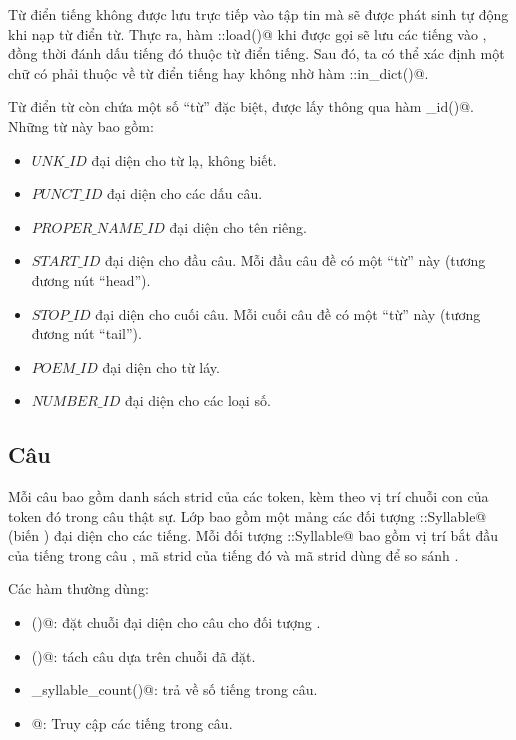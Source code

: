 \documentclass[a4paper,oneside,14pt]{extbook} %
\begin{document}
Từ điển tiếng không được lưu trực tiếp vào tập tin mà sẽ được phát
sinh tự động khi nạp từ điển từ. Thực ra, hàm \verb@WordNode::load()@
khi được gọi sẽ lưu các tiếng vào \verb@StringArchive@, đồng thời đánh
dấu tiếng đó thuộc từ điển tiếng. Sau đó, ta có thể xác định một chữ
có phải thuộc về từ điển tiếng hay không nhờ hàm
\verb@StringArchive::in_dict()@.

Từ điển từ còn chứa một số ``từ'' đặc biệt, được lấy thông qua hàm
\verb@get_id()@. Những từ này bao gồm:
\begin{itemize}
\item $UNK\_ID$  đại diện cho từ lạ, không biết.
\item $PUNCT\_ID$ đại diện cho các dấu câu.
\item $PROPER\_NAME\_ID$ đại diện cho tên riêng.
\item $START\_ID$ đại diện cho đầu câu. Mỗi đầu câu đề có một ``từ''
  này (tương đương nút ``head'').
\item $STOP\_ID$ đại diện cho cuối câu. Mỗi cuối câu đề có một ``từ''
  này (tương đương nút ``tail'').
\item $POEM\_ID$ đại diện cho từ láy.
\item $NUMBER\_ID$ đại diện cho các loại số.
\end{itemize}

\subsection{Câu}

Mỗi câu bao gồm danh sách strid của các token, kèm theo vị trí chuỗi
con của token đó trong câu thật sự. Lớp \verb@Sentence@ bao gồm một
mảng các đối tượng \verb@Sentence::Syllable@ (biến \verb@syllables@) đại diện cho các
tiếng. Mỗi đối tượng \verb@Sentence::Syllable@ bao gồm vị trí bắt đầu
của tiếng trong câu \verb@start@, mã strid của tiếng đó \verb@id@ và
mã strid dùng để so sánh \verb@cid@.

Các hàm thường dùng:
\begin{itemize}
\item \verb@set()@: đặt chuỗi đại diện cho câu cho đối tượng
  \verb@Sentence@. 
\item \verb@tokenize()@: tách câu dựa trên chuỗi đã đặt.
\item \verb@get_syllable_count()@: trả về số tiếng trong câu.
\item \verb@operator[]@: Truy cập các tiếng trong câu.
\end{itemize}
\end{document}
